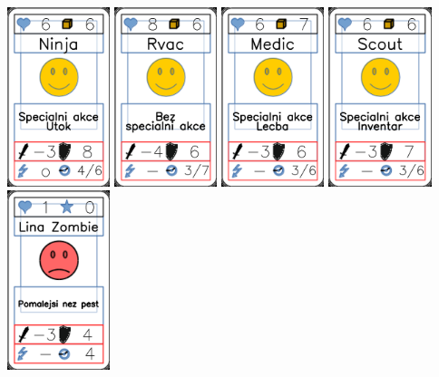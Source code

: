 \documentclass[a4paper]{article}
\begin{document}
	\includegraphics[width=3.0cm]{img-6_0}
	\includegraphics[width=3.0cm]{img-6_1}
	\includegraphics[width=3.0cm]{img-6_2}
	\includegraphics[width=3.0cm]{img-6_3}
	\includegraphics[width=3.0cm]{img-7_0}
\end{document}

